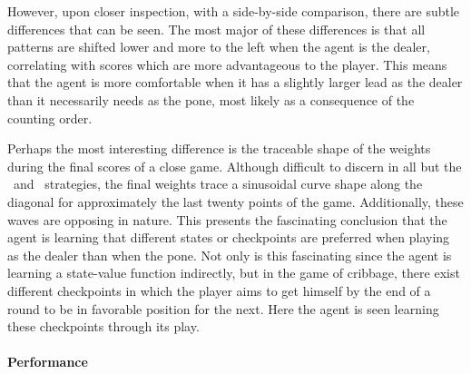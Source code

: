 However,
upon closer inspection,
with a side-by-side comparison,
there are subtle differences that can be seen.
%
The most major of these differences is that all patterns are shifted lower and
more to the left when the agent is the dealer,
correlating with scores which are more advantageous to the player.
%
This means that the agent is more comfortable when it has a slightly larger
lead as the dealer than it necessarily needs as the pone,
most likely as a consequence of the counting order.



Perhaps the most interesting difference is the traceable shape of the weights
during the final scores of a close game.
%
Although difficult to discern in all but the \handmaxmin\ and \handmaxavg\ 
strategies,
the final weights trace a sinusoidal curve shape along the diagonal
for approximately the last twenty points of the game.
%
Additionally,
these waves are opposing in nature.
%
This presents the fascinating conclusion that the agent is learning
that different states or checkpoints are preferred when playing as
the dealer than when the pone.
%
Not only is this fascinating since the agent is learning a state-value function
indirectly,
but in the game of cribbage,
there exist different checkpoints in which the player aims to get
himself by the end of a round to be in favorable position for the next.
%
Here the agent is seen learning these checkpoints through its play.


\paragraph*{Performance}

